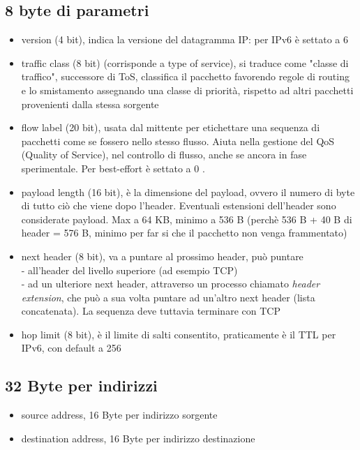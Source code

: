 \documentclass[11pt, oneside]{article}   	%
\begin{document}
\subsection*{8 byte di parametri}
\begin{itemize}
\item version (4 bit), indica la versione del datagramma IP: per IPv6 è settato a 6 
\item traffic class (8 bit) (corrisponde a type of service), si traduce come "classe di traffico", successore di ToS, classifica il pacchetto favorendo regole di routing e lo smistamento assegnando una classe di priorità, rispetto ad altri pacchetti provenienti dalla stessa sorgente
\item flow label (20 bit), usata dal mittente per etichettare una sequenza di pacchetti come se fossero nello stesso flusso. Aiuta nella gestione del QoS (Quality of Service), nel controllo di flusso, anche se ancora in fase sperimentale. Per best-effort è settato a 0 .
\item payload length (16 bit), è la dimensione del payload, ovvero il numero di byte di tutto ciò che viene dopo l'header. Eventuali estensioni dell'header sono considerate payload. Max a 64 KB, minimo a 536 B (perchè 536 B + 40 B di header = 576 B, minimo per far si che il pacchetto non venga frammentato) 
\item next header (8 bit), va a puntare al prossimo header, può puntare\\
- all'header del livello superiore (ad esempio TCP)\\
- ad un ulteriore next header, attraverso un processo chiamato \emph{header extension}, che può a sua volta puntare ad un'altro next header (lista concatenata). La sequenza deve tuttavia terminare con TCP
\item hop limit (8 bit), è il limite di salti consentito, praticamente è il TTL per IPv6, con default a 256
\end{itemize}
\subsection*{32 Byte per indirizzi}
\begin{itemize}
\item source address, 16 Byte per indirizzo sorgente 
\item destination address, 16 Byte per indirizzo destinazione
\end{itemize}
\end{document}
